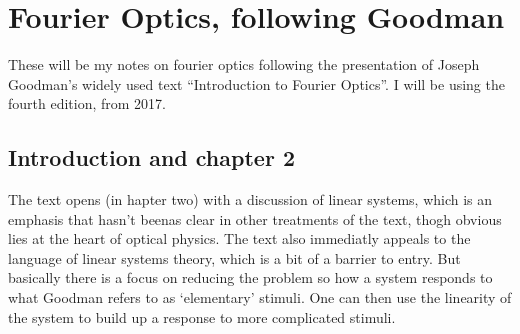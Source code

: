 \documentclass[../../main.tex]{subfiles}
\begin{document}
\chapter{Fourier Optics, following Goodman}

These will be my notes on fourier optics following the presentation of Joseph Goodman's widely used text ``Introduction to Fourier Optics''. I will be using the fourth edition, from 2017.
\section{Introduction and chapter 2}
The text opens (in hapter two) with a discussion of linear systems, which is an emphasis that hasn't beenas clear in other treatments of the text, thogh obvious lies at the heart of optical physics. The text also immediatly appeals to the language of linear systems theory, which is a bit of a barrier to entry. But basically there is a focus on reducing the problem so how a system responds to what Goodman refers to as `elementary' stimuli. One can then use the linearity of the system to build up a response to more complicated stimuli.
\end{document}
